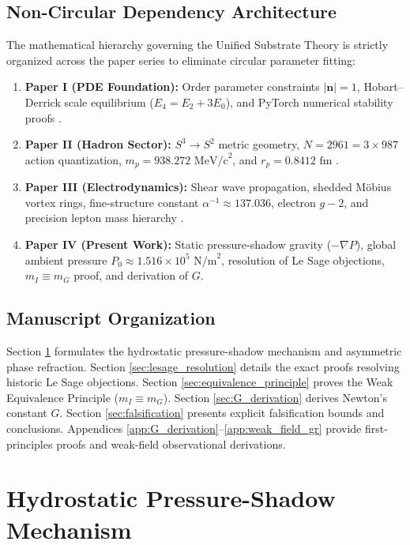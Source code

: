 \documentclass[11pt,a4paper]{article}
\begin{document}
	\subsection{Non-Circular Dependency Architecture}
	The mathematical hierarchy governing the Unified Substrate Theory is strictly organized across the paper series to eliminate circular parameter fitting:
	\begin{enumerate}
		\item \textbf{Paper I (PDE Foundation):} Order parameter constraints $|\mathbf{n}|=1$, Hobart--Derrick scale equilibrium ($E_4 = E_2 + 3E_0$), and PyTorch numerical stability proofs \cite{PaperI}.
		\item \textbf{Paper II (Hadron Sector):} $S^3 \to S^2$ metric geometry, $N = 2961 = 3 \times 987$ action quantization, $m_p = 938.272 \text{ MeV/c}^2$, and $r_p = 0.8412 \text{ fm}$ \cite{PaperII}.
		\item \textbf{Paper III (Electrodynamics):} Shear wave propagation, shedded Möbius vortex rings, fine-structure constant $\alpha^{-1} \approx 137.036$, electron $g-2$, and precision lepton mass hierarchy \cite{PaperIII}.
		\item \textbf{Paper IV (Present Work):} Static pressure-shadow gravity ($-\nabla P$), global ambient pressure $P_0 \approx 1.516 \times 10^5 \text{ N/m}^2$, resolution of Le Sage objections, $m_I \equiv m_G$ proof, and derivation of $G$.
	\end{enumerate}
	
	\subsection{Manuscript Organization}
	Section \ref{sec:pressure_shadow_mechanism} formulates the hydrostatic pressure-shadow mechanism and asymmetric phase refraction. Section \ref{sec:lesage_resolution} details the exact proofs resolving historic Le Sage objections. Section \ref{sec:equivalence_principle} proves the Weak Equivalence Principle ($m_I \equiv m_G$). Section \ref{sec:G_derivation} derives Newton's constant $G$. Section \ref{sec:falsification} presents explicit falsification bounds and conclusions. Appendices \ref{app:G_derivation}--\ref{app:weak_field_gr} provide first-principles proofs and weak-field observational derivations.
	
	\section{Hydrostatic Pressure-Shadow Mechanism}
	\label{sec:pressure_shadow_mechanism}
	
\end{document}
